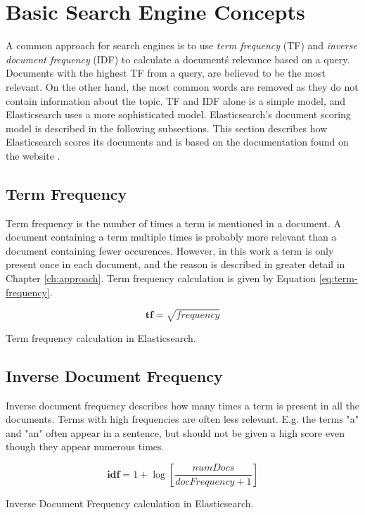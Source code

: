 \section{Basic Search Engine Concepts}
A common approach for search engines is to use \textit{term frequency} (TF) and \textit{inverse document frequency} (IDF) to calculate a document\'s relevance based on a query.
Documents with the highest TF from a query, are believed to be the most relevant.
On the other hand, the most common words are removed as they do not contain information about the topic.
TF and IDF alone is a simple model, and Elasticsearch uses a more sophisticated model.
Elasticsearch's document scoring model is described in the following subsections.
This section describes how Elasticsearch scores its documents and is based on the documentation found on the website \cite{elasticsearch-scoring}.

\subsection{Term Frequency}
Term frequency is the number of times a term is mentioned in a document.
A document containing a term multiple times is probably more relevant than a document containing fewer occurences.
However, in this work a term is only present once in each document, and the reason is described in greater detail in Chapter \ref{ch:approach}.
Term frequency calculation is given by Equation \ref{eq:term-frequency}.

\begin{cequation}[H]
	\begin{equation}
		\mathbf{tf} = \sqrt{frequency}
	\end{equation}
	\caption{Term frequency calculation in Elasticsearch.}
  \label{eq:term-frequency}
\end{cequation}

\subsection{Inverse Document Frequency}
Inverse document frequency describes how many times a term is present in all the documents.
Terms with high frequencies are often less relevant.
E.g. the terms "a" and "an" often appear in a sentence, but should not be given a high score even though they appear numerous times.
\begin{cequation}[H]
	\begin{equation}
		\mathbf{idf} = 1 + \log{[\frac{numDocs}{docFrequency + 1}]}
	\end{equation}
	\caption{Inverse Document Frequency calculation in Elasticsearch.}
  \label{eq:idf}
\end{cequation}

